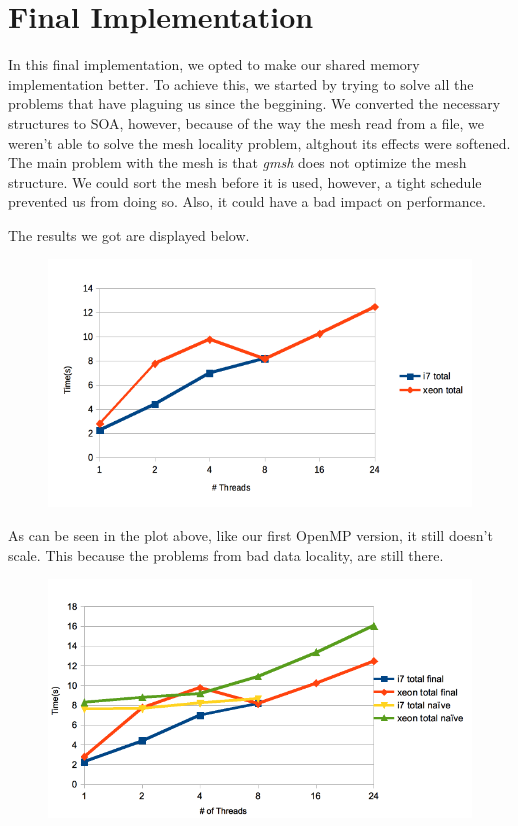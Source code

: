 \documentclass[a4paper,10pt,openright,openbib,twocolumn]{article}
\begin{document}
\section{Final Implementation}
\label{final}

In this final implementation, we opted to make our shared memory implementation better. To achieve this, we started by trying to solve all the problems that have plaguing us since the beggining. We converted the necessary structures to SOA, however, because of the way the mesh read from a file, we weren't able to solve the mesh locality problem, altghout its effects were softened. The main problem with the mesh is that \emph{gmsh} does not optimize the mesh structure. We could sort the mesh before it is used, however, a tight schedule prevented us from doing so. Also, it could have a bad impact on performance. 

The results we got are displayed below. 

    \begin{figure}[H]
        \centering   
        \includegraphics[width=\columnwidth]{../images/time_final.png}        
    \end{figure}

    As can be seen in the plot above, like our first OpenMP version, it still doesn't scale. This because the problems from bad data locality, are still there.

    \begin{figure}[H]
        \centering  
        \includegraphics[width=\columnwidth]{../images/time_compare2.png}        
    \end{figure}
\end{document}

